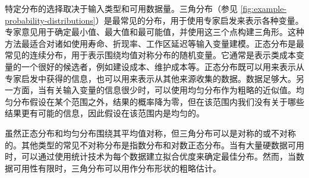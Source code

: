 特定分布的选择取决于输入类型和可用数据量。三角分布（参见 \cref{fig:example-probability-distributions}）是最常见的分布，用于使用专家启发来表示各种变量。专家意见用于确定最小值、最大值和最可能值，并使用这三个点构建三角形。这种方法最适合对诸如使用寿命、折现率、工作区延迟等输入变量建模。正态分布是最常见的连续分布，用于表示围绕均值对称分布的随机变量。它通常是表示类成本变量的一个很好的候选者，例如建设成本、维护成本等。正态分布既可以用来表示从专家启发中获得的信息，也可以用来表示从其他来源收集的数据。数据足够大。另一方面，当有关输入变量的信息很少时，可以使用均匀分布作为粗略的近似值。均匀分布假设在某个范围之外，结果的概率降为零，但在该范围内我们没有关于哪些结果更有可能的信息，因此假设在该范围内是均匀的。

虽然正态分布和均匀分布围绕其平均值对称，但三角分布可以是对称的或不对称的。其他类型的常见不对称分布是指数分布和对数正态分布。当有大量硬数据可用时，可以通过使用统计技术为每个数据建立拟合优度来确定最佳分布。然而，当数据可用性有限时，三角分布可以用作分布形状的粗略估计。

